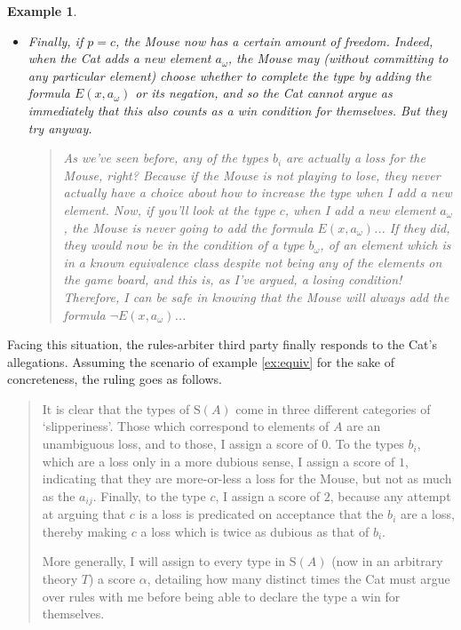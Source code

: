 \documentclass{article}
\newtheorem{example}[theorem]{Example}
\theoremstyle{nonumberplain}
\newcommand{\Stone}{\mathrm{S}}
\begin{document}
\begin{example}
\begin{itemize}
\item Finally, if $p = c$, the Mouse now has a certain amount of freedom. Indeed, when the Cat adds a new element $a_\omega$, the Mouse may (without committing to any particular element) choose whether to complete the type by adding the formula $E(x,a_\omega)$ or its negation, and so the Cat cannot argue as immediately that this also counts as a win condition for themselves. But they try anyway.
\begin{quote}
As we've seen before, any of the types $b_i$ are actually a loss for the Mouse, right? Because if the Mouse is not playing to lose, they never actually have a choice about how to increase the type when I add a new element. Now, if you'll look at the type $c$, when I add a new element $a_\omega$, the Mouse is never going to add the formula $E(x,a_\omega)$... If they did, they would now be in the condition of a type $b_\omega$, of an element which is in a known equivalence class despite not being any of the elements on the game board, and this is, as I've argued, a losing condition! Therefore, I can be safe in knowing that the Mouse will always add the formula $\neg E(x,a_\omega)$...
\end{quote}
\end{itemize}
\end{example}

Facing this situation, the rules-arbiter third party finally responds to the Cat's allegations. Assuming the scenario of example \ref{ex:equiv} for the sake of concreteness, the ruling goes as follows.
\begin{quote}
It is clear that the types of $\Stone(A)$ come in three different categories of `slipperiness'. Those which correspond to elements of $A$ are an unambiguous loss, and to those, I assign a score of $0$. To the types $b_i$, which are a loss only in a more dubious sense, I assign a score of $1$, indicating that they are more-or-less a loss for the Mouse, but not as much as the $a_{ij}$. Finally, to the type $c$, I assign a score of $2$, because any attempt at arguing that $c$ is a loss is predicated on acceptance that the $b_i$ are a loss, thereby making $c$ a loss which is twice as dubious as that of $b_i$.

More generally, I will assign to every type in $\Stone(A)$ (now in an arbitrary theory $T$) a score $\alpha$, detailing how many distinct times the Cat must argue over rules with me before being able to declare the type a win for themselves.
\end{quote}
\end{document}
